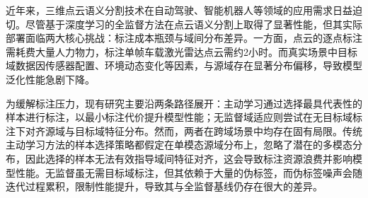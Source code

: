 




近年来，三维点云语义分割技术在自动驾驶、智能机器人等领域的应用需求日益迫切。尽管基于深度学习的全监督方法在点云语义分割上取得了显著性能，但其实际部署面临两大核心挑战：标注成本瓶颈与域间分布差异。一方面，点云的逐点标注需耗费大量人力物力，标注单帧车载激光雷达点云需约2小时。而真实场景中目标域数据因传感器配置、环境动态变化等因素，与源域存在显著分布偏移，导致模型泛化性能急剧下降。  

为缓解标注压力，现有研究主要沿两条路径展开：主动学习通过选择最具代表性的样本进行标注，以最小标注代价提升模型性能；无监督域适应则尝试在无目标域标注下对齐源域与目标域特征分布。然而，两者在跨域场景中均存在固有局限。传统主动学习方法的样本选择策略都假定在单模态源域分布上，忽略了潜在的多模态分布，因此选择的样本无法有效指导域间特征对齐，这会导致标注资源浪费并影响模型性能。无监督虽无需目标域标注，但其依赖于大量的伪标签，而伪标签噪声会随迭代过程累积，限制性能提升，导致其与全监督基线仍存在很大的差异。

